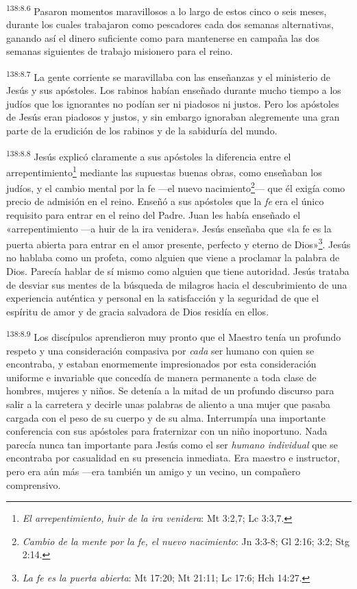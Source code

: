 \par 
\textsuperscript{138:8.6} Pasaron momentos maravillosos a lo largo de estos cinco o seis meses, durante los cuales trabajaron como pescadores cada dos semanas alternativas, ganando así el dinero suficiente como para mantenerse en campaña las dos semanas siguientes de trabajo misionero para el reino.

\par 
\textsuperscript{138:8.7} La gente corriente se maravillaba con las enseñanzas y el ministerio de Jesús y sus apóstoles. Los rabinos habían enseñado durante mucho tiempo a los judíos que los ignorantes no podían ser ni piadosos ni justos. Pero los apóstoles de Jesús eran piadosos y justos, y sin embargo ignoraban alegremente una gran parte de la erudición de los rabinos y de la sabiduría del mundo.

\par 
\textsuperscript{138:8.8} Jesús explicó claramente a sus apóstoles la diferencia entre el arrepentimiento\footnote{\textit{El arrepentimiento, huir de la ira venidera}: Mt 3:2,7; Lc 3:3,7.} mediante las supuestas buenas obras, como enseñaban los judíos, y el cambio mental por la fe ---el nuevo nacimiento\footnote{\textit{Cambio de la mente por la fe, el nuevo nacimiento}: Jn 3:3-8; Gl 2:16; 3:2; Stg 2:14.}--- que él exigía como precio de admisión en el reino. Enseñó a sus apóstoles que la \textit{fe} era el único requisito para entrar en el reino del Padre. Juan les había enseñado el «arrepentimiento ---a huir de la ira venidera». Jesús enseñaba que «la fe es la puerta abierta para entrar en el amor presente, perfecto y eterno de Dios»\footnote{\textit{La fe es la puerta abierta}: Mt 17:20; Mt 21:11; Lc 17:6; Hch 14:27.}. Jesús no hablaba como un profeta, como alguien que viene a proclamar la palabra de Dios. Parecía hablar de sí mismo como alguien que tiene autoridad. Jesús trataba de desviar sus mentes de la búsqueda de milagros hacia el descubrimiento de una experiencia auténtica y personal en la satisfacción y la seguridad de que el espíritu de amor y de gracia salvadora de Dios residía en ellos.

\par 
\textsuperscript{138:8.9} Los discípulos aprendieron muy pronto que el Maestro tenía un profundo respeto y una consideración compasiva por \textit{cada} ser humano con quien se encontraba, y estaban enormemente impresionados por esta consideración uniforme e invariable que concedía de manera permanente a toda clase de hombres, mujeres y niños. Se detenía a la mitad de un profundo discurso para salir a la carretera y decirle unas palabras de aliento a una mujer que pasaba cargada con el peso de su cuerpo y de su alma. Interrumpía una importante conferencia con sus apóstoles para fraternizar con un niño inoportuno. Nada parecía nunca tan importante para Jesús como el ser \textit{humano individual} que se encontraba por casualidad en su presencia inmediata. Era maestro e instructor, pero era aún más ---era también un amigo y un vecino, un compañero comprensivo.

